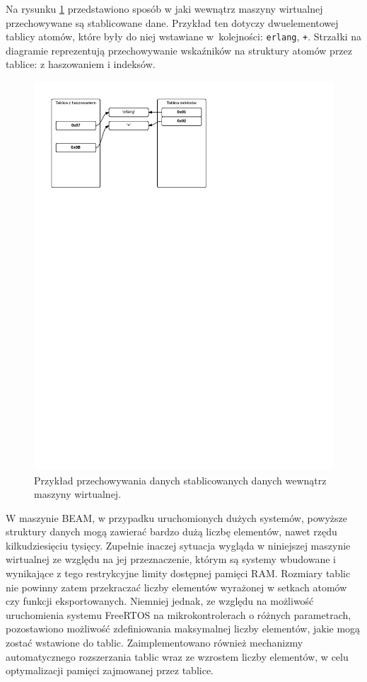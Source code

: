 Na rysunku \ref{fig:atomtable} przedstawiono sposób w jaki wewnątrz maszyny wirtualnej przechowywane są stablicowane dane.  Przykład ten dotyczy dwuelementowej tablicy atomów, które były do niej wstawiane w~kolejności: \texttt{erlang}, \texttt{+}. Strzałki na diagramie reprezentują przechowywanie wskaźników na struktury atomów przez tablice: z haszowaniem i indeksów.

\begin{figure}[h]
\centerline{\includegraphics[scale=1, clip, trim=10mm 200mm 90mm 10mm]{atom_table}}
\caption{Przykład przechowywania danych stablicowanych danych wewnątrz maszyny wirtualnej.}
\label{fig:atomtable}
\end{figure}

W maszynie BEAM, w przypadku uruchomionych dużych systemów, powyższe struktury danych mogą zawierać bardzo dużą liczbę elementów, nawet rzędu kilkudziesięciu tysięcy. Zupełnie inaczej sytuacja wygląda w niniejszej maszynie wirtualnej ze względu na jej przeznaczenie, którym są systemy wbudowane i wynikające z tego restrykcyjne limity dostępnej pamięci RAM. Rozmiary tablic nie powinny zatem przekraczać liczby elementów wyrażonej w setkach atomów czy funkcji eksportowanych. Niemniej jednak, ze względu na możliwość uruchomienia systemu FreeRTOS na mikrokontrolerach o różnych parametrach, pozostawiono możliwość zdefiniowania maksymalnej liczby elementów, jakie mogą zostać wstawione do tablic. Zaimplementowano również mechanizmy automatycznego rozszerzania tablic wraz ze wzrostem liczby elementów, w celu optymalizacji pamięci zajmowanej przez tablice.

